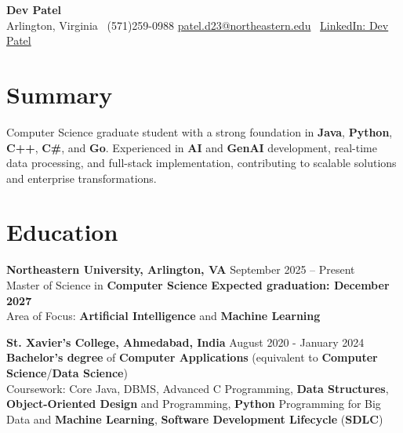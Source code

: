 \documentclass[a4paper,10pt]{article}
\begin{document}
\begin{center}
\vspace{-3mm}
    \fontsize{16}{18}\selectfont \textbf{Dev Patel} \\
    \vspace{0mm}
    \normalsize Arlington, Virginia \textbar\ (571)259-0988  \textbar       \href{mailto:patel.d23@northeastern.edu}{patel.d23@northeastern.edu} \textbar\ \href{https://www.linkedin.com/in/devxpatel//}{LinkedIn: Dev Patel} \\
\end{center}

\section*{Summary}
\vspace{-0mm}
Computer Science graduate student with a strong foundation in \textbf{Java}, \textbf{Python}, \textbf{C++}, \textbf{C\#}, and \textbf{Go}. Experienced in \textbf{AI} and \textbf{GenAI} development, real-time data processing, and full-stack implementation, contributing to scalable solutions and enterprise transformations.
 
\vspace{0 mm}
\section*{Education}
\textbf{Northeastern University, Arlington, VA} \hfill September 2025 -- Present\\
Master of Science in \textbf{Computer Science} \hfill \textbf{Expected graduation: December 2027} \\
Area of Focus: \textbf{Artificial Intelligence} and \textbf{Machine Learning}

\vspace{1 mm} %
\textbf{St. Xavier's College, Ahmedabad, India} \hfill August 2020 - January 2024 \\
\textbf{Bachelor's degree} of \textbf{Computer Applications} (equivalent to \textbf{Computer Science}/\textbf{Data Science})\\
Coursework: Core Java, DBMS, Advanced C Programming, \textbf{Data Structures}, \textbf{Object-Oriented Design} and Programming, \textbf{Python} Programming for Big Data and \textbf{Machine Learning}, \textbf{Software Development Lifecycle} (\textbf{SDLC})
\end{document}
